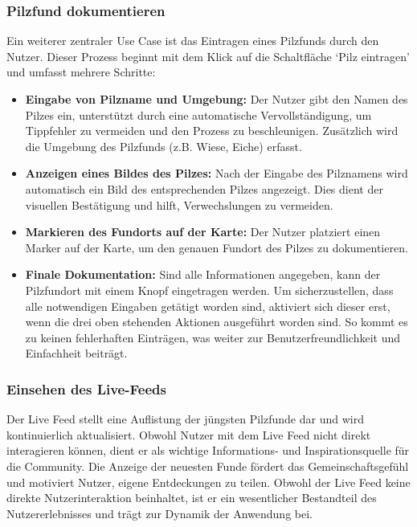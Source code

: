\documentclass[../main.tex]{subfiles} %
\begin{document}
\subsubsection{Pilzfund dokumentieren}

Ein weiterer zentraler Use Case ist das Eintragen eines Pilzfunds durch den Nutzer. Dieser Prozess beginnt mit dem Klick
auf die Schaltfläche `Pilz eintragen' und umfasst mehrere Schritte:

\begin{itemize}

	\item \textbf{Eingabe von Pilzname und Umgebung:}
	      Der Nutzer gibt den Namen des Pilzes ein, unterstützt durch eine automatische Vervollständigung, um Tippfehler zu
	      vermeiden und den Prozess zu beschleunigen. Zusätzlich wird die Umgebung des Pilzfunds (z.B. Wiese, Eiche) erfasst.

	\item \textbf{Anzeigen eines Bildes des Pilzes:}
	      Nach der Eingabe des Pilznamens wird automatisch ein Bild des entsprechenden Pilzes angezeigt. Dies dient der visuellen
	      Bestätigung und hilft, Verwechslungen zu vermeiden.

	\item \textbf{Markieren des Fundorts auf der Karte:}
	      Der Nutzer platziert einen Marker auf der Karte, um den genauen Fundort des Pilzes zu dokumentieren.

	\item \textbf{Finale Dokumentation:}
	      Sind alle Informationen angegeben, kann der Pilzfundort mit einem Knopf eingetragen werden. Um sicherzustellen, dass alle
	      notwendigen Eingaben getätigt worden sind, aktiviert sich dieser erst, wenn die drei oben stehenden Aktionen ausgeführt
	      worden sind. So kommt es zu keinen fehlerhaften Einträgen, was weiter zur Benutzerfreundlichkeit und Einfachheit beiträgt.

\end{itemize}

\subsubsection{Einsehen des Live-Feeds}

Der Live Feed stellt eine Auflistung der jüngsten Pilzfunde dar und wird kontinuierlich aktualisiert. Obwohl Nutzer mit dem
Live Feed nicht direkt interagieren können, dient er als wichtige Informations- und Inspirationsquelle für die Community.
Die Anzeige der neuesten Funde fördert das Gemeinschaftsgefühl und motiviert Nutzer, eigene Entdeckungen zu teilen. Obwohl der
Live Feed keine direkte Nutzerinteraktion beinhaltet, ist er ein wesentlicher Bestandteil des Nutzererlebnisses und trägt zur
Dynamik der Anwendung bei.
\end{document}
